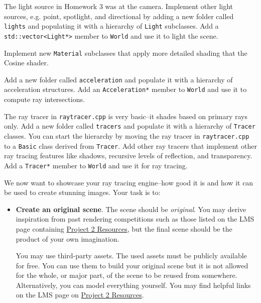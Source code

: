 \documentclass[addpoints]{exam}
\begin{document}
\begin{questions}
  
  The light source in Homework 3 was at the camera. Implement other light sources, e.g. point, spotlight, and directional by adding a new folder called \texttt{lights} and populating it with a hierarchy of \texttt{Light} subclasses. Add a \texttt{std::vector<Light*>} member to \texttt{World} and use it to light the scene.

  Implement new \texttt{Material} subclasses that apply more detailed shading that the Cosine shader.

  Add a new folder called \texttt{acceleration} and populate it with a hierarchy of acceleration structures. Add an \texttt{Acceleration*} member to \texttt{World} and use it to compute ray intersections.

  The ray tracer in \texttt{raytracer.cpp} is very basic--it shades based on primary rays only. Add a new folder called \texttt{tracers} and populate it with a hierarchy of \texttt{Tracer} classes. You can start the hierarchy by moving the ray tracer in \texttt{raytracer.cpp} to a \texttt{Basic} class derived from \texttt{Tracer}. Add other ray tracers that implement other ray tracing features like shadows, recursive levels of reflection, and transparency. Add a \texttt{Tracer*} member to \texttt{World} and use it for ray tracing.

  \newpage
  We now want to showcase your ray tracing engine--how good it is and how it can be used to create stunning images. Your task is to:
  \begin{itemize}
  \item \textbf{Create an original scene}. The scene should be \emph{original}. You may derive inspiration from past rendering competitions such as those listed on the LMS page containing \href{https://hulms.instructure.com/courses/1622/pages/project-2-resources?module_item_id=55192}{Project 2 Resources}, but the final scene should be the product of your own imagination.
    
    You may use third-party assets. The used assets must be publicly available for free. You can use them to build your original scene but it is not allowed for the whole, or major part, of the scene to be reused from somewhere. Alternatively, you can model everything yourself. You may find helpful links on the LMS page on  \href{https://hulms.instructure.com/courses/1622/pages/project-2-resources?module_item_id=55192}{Project 2 Resources}.


\end{itemize}
\end{questions}
\end{document}
